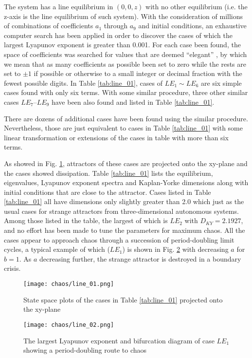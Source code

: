 The system has a line equilibrium in $(0,0,z)$ with no other
equilibrium (i.e. the z-axis is the line equilibrium of such
system). With the consideration of millions of combinations
of coefficients $a_1$ through $a_9$ and initial conditions,
an exhaustive computer search has been applied in order to
discover the cases of which the largest Lyapunov exponent
is greater than 0.001. For each case been found, the space
of coefficients was searched for values that are deemed
``elegant'' \cite{Sprott2010Elegant}, by which we mean
that as many coefficients as possible been set to zero
while the rests are set to $\pm 1$ if possible or otherwise
to a small integer or decimal fraction with the fewest
possible digits.
In Table \ref{tab:line_01}, cases of $LE_1\sim{}LE_6$ are six
simple cases found with only six terms.
With some similar procedure, three other similar cases $LE_7–LE_9$
have been also found and listed in Table \ref{tab:line_01}.

There are dozens of additional cases have been found using
the similar procedure. Nevertheless, those are just equivalent to
cases in Table \ref{tab:line_01} with some linear transformation or
extensions of the cases in table with more than six terms.

As showed in Fig. \ref{fig:line_fig1}, attractors of these cases are
projected onto the xy-plane and the cases showed dissipation.
Table \ref{tab:line_01} lists the equilibrium, eigenvalues, Lyapunov
exponent spectra and Kaplan-Yorke dimensions along with initial
conditions that are close to the attractor.
Cases listed in Table \ref{tab:line_01} all have dimensions only
slightly greater than 2.0 which just as the usual cases 
for strange attractors from three-dimensional autonomous systems.
Among those listed in the table, the largest of which is $LE_2$ with
$D_{KY} = 2.1927$, and no effort has been made to tune the parameters
for maximum chaos. All the cases appear to approach chaos through a
succession of period-doubling limit cycles, a typical example
of which ($LE_1$) is shown in Fig. \ref{fig:line_fig2} with decreasing $a$ for
$b = 1$. As $a$ decreasing further, the strange attractor is destroyed
in a boundary crisis.

\begin{figure}[htbp]
\centering
\texttt{[image: chaos/line\_01.png]}
\caption{\label{fig:line_fig1}
State space plots of the cases in Table \ref{tab:line_01} projected onto the xy-plane}
\end{figure}

\begin{figure}[htbp]
\centering
\texttt{[image: chaos/line\_02.png]}
\caption{\label{fig:line_fig2}
  The largest Lyapunov exponent and bifurcation diagram of case $LE_1$ showing a period-doubling route to chaos}
\end{figure}


